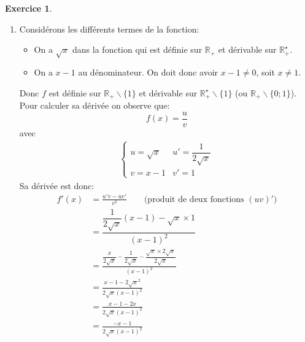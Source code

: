\documentclass{exam}
\theoremstyle{definition}
\newtheorem{exercice}{Exercice}
\begin{document}
\begin{exercice}
\begin{enumerate}
\begin{align*}
            &= \frac{1}{3}\left(x^3\right)' + 7\left(\frac{1}{x}\right)' \qquad \text{(produit par une constante $(\lambda u)' = \lambda u')$}\\
            &= \frac{1}{3}\times 3x^2 + 7 \left(-\frac{1}{x^2}\right)\\
            &= x^2 - \frac{7}{x^2}
        \end{align*}
        \newpage
        \item Considérons les différents termes de la fonction:
        \begin{itemize}
            \item On a $\sqrt{x}$ dans la fonction qui est définie sur $\mathbb{R}_+$ et dérivable sur $\mathbb{R}_+^\star$.
            \item On a $x - 1$ au dénominateur. On doit donc avoir $x - 1 \neq 0$, soit $x \neq 1$.
        \end{itemize}
        Donc $f$ est définie sur $\mathbb{R}_+ \backslash \{ 1 \}$ et dérivable sur $\mathbb{R}_+^\star \backslash \{ 1 \}$ (ou $\mathbb{R}_+ \backslash \{ 0; 1 \}$).\\
        Pour calculer sa dérivée on observe que:
        $$
        f(x) = \frac{u}{v}
        $$
        avec
        \begin{align*}
        \begin{cases}
            u = \sqrt{x} & u' = \dfrac{1}{2\sqrt{x}}\\
            v = x - 1 & v' = 1
        \end{cases}
        \end{align*}
        Sa dérivée est donc:
        \begin{align*}
            f'(x) &= \frac{u'v - uv'}{v^2} \qquad \text{(produit de deux fonctions $(uv)'$)}\\
            &= \dfrac{\dfrac{1}{2\sqrt{x}}(x - 1) - \sqrt{x}\times 1}{(x - 1)^2}\\
            &= \frac{\dfrac{x}{2\sqrt{x}} - \dfrac{1}{2\sqrt{x}} - \dfrac{\sqrt{x}\times2\sqrt{x}}{2\sqrt{x}}}{(x - 1)^2}\\
            &= \frac{x-1-2\sqrt{x}^2}{2\sqrt{x}(x - 1)^2}\\
            &= \frac{x - 1 - 2x}{2\sqrt{x}(x - 1)^2}\\
            &= \frac{-x - 1}{2\sqrt{x}(x - 1)^2}
        \end{align*}
    \end{enumerate}
\end{exercice}
\end{document}
